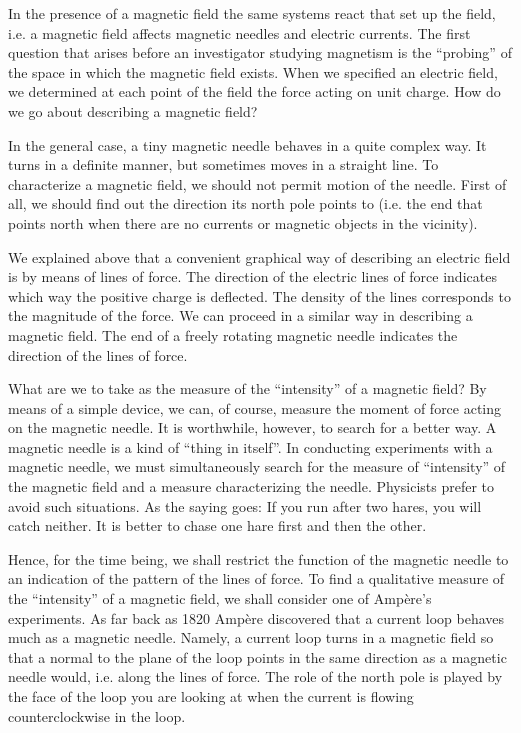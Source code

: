 In the presence of a magnetic field the same systems react that set up the field, i.e. a magnetic field affects magnetic needles and electric currents. The first question that arises before an investigator studying magnetism is the ``probing'' of the space in which the magnetic field exists. When we specified an electric field, we determined at each point of the field the force acting on unit charge. How do we go about describing a magnetic field?

In the general case, a tiny magnetic needle behaves in a quite complex way. It turns in a definite manner, but sometimes moves in a straight line. To characterize a magnetic field, we should not permit motion of the needle. First of all, we should find out the direction its north pole points to (i.e. the end that points north when there are no currents or magnetic objects in the vicinity).

We explained above that a convenient graphical way of describing an electric field is by means of lines of force. The direction of the electric lines of force indicates which way the positive charge is deflected. The density of the lines corresponds to the magnitude of the force. We can proceed in a similar way in describing a magnetic field. The end of a freely rotating magnetic needle indicates the direction of the lines of force.

What are we to take as the measure of the ``intensity'' of a magnetic field? By means of a simple device, we can, of course, measure the moment of force acting on the magnetic needle. It is worthwhile, however, to search for a better way. A magnetic needle is a kind of ``thing in itself''. In conducting experiments with a magnetic needle, we must simultaneously search for the measure of ``intensity'' of the magnetic field and a measure characterizing the needle. Physicists prefer to avoid such situations. As the saying goes: If you run after two hares, you will catch neither. It is better to chase one hare first and then the other.

Hence, for the time being, we shall restrict the function of the magnetic needle to an indication of the pattern of the lines of force. To find a qualitative measure of the ``intensity'' of a magnetic field, we shall consider one of Amp\`ere's experiments. As far back as 1820 Amp\`ere discovered that a current loop behaves much as a magnetic needle. Namely, a current loop turns in a magnetic field so that a normal to the plane of the loop points in the same direction as a magnetic needle would, i.e. along the lines of force. The role of the north pole is played by the face of the loop you are looking at when the current is flowing counterclockwise in the loop.

